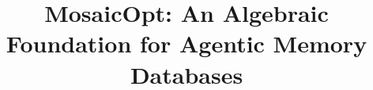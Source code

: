 \documentclass[sigconf]{acmart}
\theoremstyle{plain}
\theoremstyle{definition}
\newcommand{\eat}[1]{}
\theoremstyle{remark}
\begin{document}
\title{MosaicOpt: An Algebraic Foundation for Agentic Memory Databases}

\eat{\author{Ben Trovato}
\authornote{Both authors contributed equally to this research.}
\email{trovato@corporation.com}
\orcid{1234-5678-9012}
\author{G.K.M. Tobin}
\correspondingauthor
\authornotemark[1]
\email{webmaster@marysville-ohio.com}
\affiliation{%
  \institution{Institute for Clarity in Documentation}
  \city{Dublin}
  \state{Ohio}
  \country{USA}
}

\author{Lars Th{\o}rv{\"a}ld}
\affiliation{%
  \institution{The Th{\o}rv{\"a}ld Group}
  \city{Hekla}
  \country{Iceland}}
\email{larst@affiliation.org}

\author{Valerie B\'eranger}
\affiliation{%
  \institution{Inria Paris-Rocquencourt}
  \city{Rocquencourt}
  \country{France}
}

\author{Aparna Patel}
\affiliation{%
 \institution{Rajiv Gandhi University}
 \city{Doimukh}
 \state{Arunachal Pradesh}
 \country{India}}

\author{Huifen Chan}
\affiliation{%
  \institution{Tsinghua University}
  \city{Haidian Qu}
  \state{Beijing Shi}
  \country{China}}

\author{Charles Palmer}
\affiliation{%
  \institution{Palmer Research Laboratories}
  \city{San Antonio}
  \state{Texas}
  \country{USA}}
\email{cpalmer@prl.com}

\author{John Smith}
\affiliation{%
  \institution{The Th{\o}rv{\"a}ld Group}
  \city{Hekla}
  \country{Iceland}}
\email{jsmith@affiliation.org}

\author{Julius P. Kumquat}
\correspondingauthor
\affiliation{%
  \institution{The Kumquat Consortium}
  \city{New York}
  \country{USA}}
\email{jpkumquat@consortium.net}

\renewcommand{\shortauthors}{Trovato et al.}
}
\end{document}
